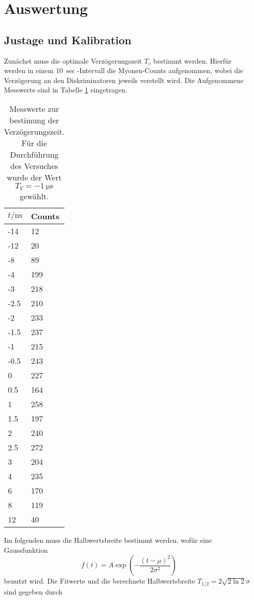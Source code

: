 \section{Auswertung}
\subsection{Justage und Kalibration}
Zunächst muss die optimale Verzögerungszeit $T_v$ bestimmt werden. Hierfür werden in einem $\SI{10}{\sec} $-Intervall die Myonen-Counts aufgenommen, wobei die Verzögerung an den Diskriminatoren jeweils verstellt wird. Die Aufgenommene Messwerte sind in Tabelle \ref{tab:Verzögerung} eingetragen.
\begin{table}
    \centering
    \begin{tabular}{@{}ll@{}}
    \toprule
     $t / \si{\nano\second}$ & Counts  \\ \midrule
-14  & 12 \\
-12  & 20 \\
-8   & 89 \\
-4   & 199\\
-3   & 218\\
-2.5 & 210\\
-2   & 233\\
-1.5 & 237\\
-1   & 215\\
-0.5 & 243\\
0    & 227\\ 
0.5  &164\\
1    &258\\
1.5  &197\\
2    &240\\
2.5  &272\\
3    &204\\
4    &235\\
6    &170\\
8    &119\\
12   &40\\
    \end{tabular}
    \caption{ Messwerte zur bestimung der Verzögerungszeit. Für die Durchführung des Versuches wurde der Wert $T_V = \SI{-1}{\micro\second}$ gewählt.}
    \label{tab:Verzögerung}
\end{table} 
Im folgenden muss die Halbwertsbreite bestimmt werden, wofür eine Gaussfunktion
\begin{equation*}
    f(t) = A\exp(- \frac{(t-\mu)^2}{2\sigma^2} )
\end{equation*}
benutzt wird. Die Fitwerte und die berechnete Halbwertsbreite $T_{1/2} =2\sqrt{2\ln2}\sigma$ sind gegeben durch 

